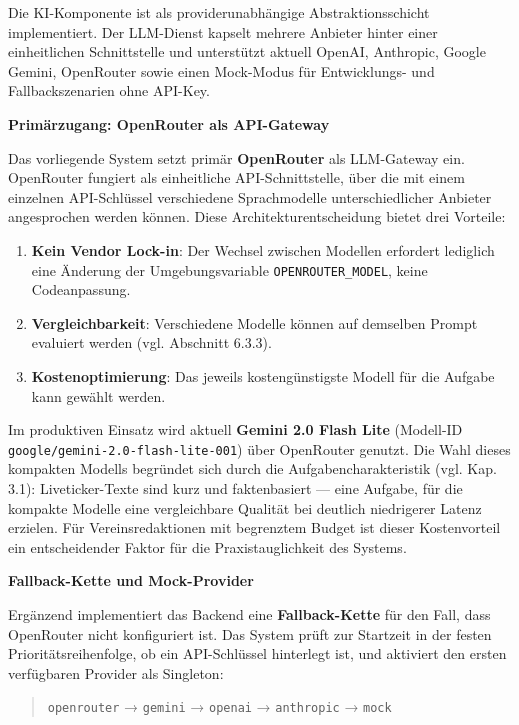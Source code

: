 Die KI-Komponente ist als providerunabhängige Abstraktionsschicht
implementiert. Der LLM-Dienst kapselt mehrere Anbieter hinter einer
einheitlichen Schnittstelle und unterstützt aktuell OpenAI, Anthropic,
Google Gemini, OpenRouter sowie einen Mock-Modus für Entwicklungs- und
Fallbackszenarien ohne API-Key.

\textbf{Primärzugang: OpenRouter als API-Gateway}

Das vorliegende System setzt primär \textbf{OpenRouter} als LLM-Gateway
ein. OpenRouter fungiert als einheitliche API-Schnittstelle, über die
mit einem einzelnen API-Schlüssel verschiedene Sprachmodelle
unterschiedlicher Anbieter angesprochen werden können. Diese
Architekturentscheidung bietet drei Vorteile:

\begin{enumerate}
\def\labelenumi{\arabic{enumi}.}
\tightlist
\item
  \textbf{Kein Vendor Lock-in}: Der Wechsel zwischen Modellen erfordert
  lediglich eine Änderung der Umgebungsvariable
  \texttt{OPENROUTER\_MODEL}, keine Codeanpassung.
\item
  \textbf{Vergleichbarkeit}: Verschiedene Modelle können auf demselben
  Prompt evaluiert werden (vgl. Abschnitt 6.3.3).
\item
  \textbf{Kostenoptimierung}: Das jeweils kostengünstigste Modell für
  die Aufgabe kann gewählt werden.
\end{enumerate}

Im produktiven Einsatz wird aktuell \textbf{Gemini 2.0 Flash Lite}
(Modell-ID \texttt{google/gemini-2.0-flash-lite-001}) über OpenRouter
genutzt. Die Wahl dieses kompakten Modells begründet sich durch die
Aufgabencharakteristik (vgl. Kap. 3.1): Liveticker-Texte sind kurz und
faktenbasiert --- eine Aufgabe, für die kompakte Modelle eine
vergleichbare Qualität bei deutlich niedrigerer Latenz erzielen. Für
Vereinsredaktionen mit begrenztem Budget ist dieser Kostenvorteil ein
entscheidender Faktor für die Praxistauglichkeit des Systems.

\textbf{Fallback-Kette und Mock-Provider}

Ergänzend implementiert das Backend eine \textbf{Fallback-Kette} für den
Fall, dass OpenRouter nicht konfiguriert ist. Das System prüft zur
Startzeit in der festen Prioritätsreihenfolge, ob ein API-Schlüssel
hinterlegt ist, und aktiviert den ersten verfügbaren Provider als
Singleton:

\begin{quote}
\texttt{openrouter} → \texttt{gemini} → \texttt{openai} →
\texttt{anthropic} → \texttt{mock}
\end{quote}

